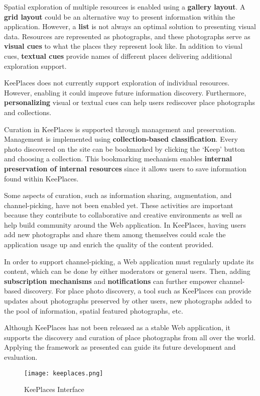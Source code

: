{Spatial exploration of multiple resources is enabled using a \textbf{gallery layout}. A \textbf{grid layout} could be an alternative way to present information within the application. However, a \textbf{list} is not always an optimal solution to presenting visual data. 
Resources are represented as photographs, and these photographs serve as \textbf{visual cues} to what the places they represent look like. In addition to visual cues, \textbf{textual cues} provide names of different places delivering additional exploration support.

KeePlaces does not currently support exploration of individual resources. However, enabling it could improve future information discovery. Furthermore, \textbf{personalizing} visual or textual cues can help users rediscover place photographs and collections. 

\pagebreak

Curation in KeePlaces is supported through management and preservation. Management is implemented using \textbf{collection-based classification}.
Every photo discovered on the site can be bookmarked by clicking the `Keep' button and choosing a collection. This bookmarking mechanism enables \textbf{internal preservation of internal resources} since it allows users to save information found within KeePlaces. 

Some aspects of curation, such as information sharing, augmentation, and channel-picking, have not been enabled yet. These activities are important because they contribute to collaborative and creative environments as well as help build community around the Web application. In KeePlaces, having users add new photographs and share them among themselves could scale the application usage up and enrich the quality of the content provided.

In order to support channel-picking, a Web application must regularly update its content, which can be done by either moderators or general users. Then, adding \textbf{subscription mechanisms} and \textbf{notifications} can further empower channel-based discovery.  For place photo discovery, a tool such as KeePlaces can provide updates about photographs preserved by other users, new photographs added to the pool of information, spatial featured photographs, etc.

Although KeePlaces has not been released as a stable Web application, it supports the discovery and curation of place photographs from all over the world. Applying the framework as presented can guide its future development and evaluation.  

\begin{figure}[ht!]
	\noindent
	\centering
	\texttt{[image: keeplaces.png]}
	\caption{KeePlaces Interface}
	\label{fig:keeplaces} 
\end{figure}

} %

